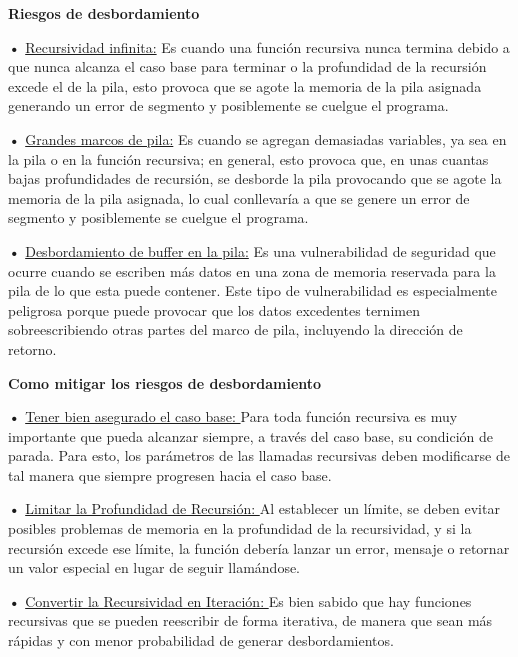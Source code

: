 \documentclass{article}
\begin{document}
\quad

\textbf{Riesgos de desbordamiento }

\quad

\textbf{•   } \underline{Recursividad infinita:} { Es cuando una función recursiva nunca termina debido a que nunca alcanza el caso base para terminar o la profundidad de la recursión excede el de la pila, esto provoca que se agote la memoria de la pila asignada generando un error de segmento y posiblemente se cuelgue el programa.}

\quad

\textbf{•   } \underline{Grandes marcos de pila:}{ Es cuando se agregan demasiadas variables, ya sea en la pila o en la función recursiva; en general, esto provoca que, en unas cuantas bajas profundidades de recursión, se desborde la pila provocando que se agote la memoria de la pila asignada, lo cual conllevaría a que se genere un error de segmento y posiblemente se cuelgue el programa.}

\quad

\textbf{•   } \underline{Desbordamiento de buffer en la pila:}{ Es una vulnerabilidad de seguridad que ocurre cuando se escriben más datos en una zona de memoria reservada para la pila de lo que esta puede contener. Este tipo de vulnerabilidad es especialmente peligrosa porque puede provocar que los datos excedentes ternimen sobreescribiendo otras partes del marco de pila, incluyendo la dirección de retorno.}

\quad

\textbf{Como mitigar los riesgos de desbordamiento }

\quad

\textbf{•   } \underline{Tener bien asegurado el caso base: }{Para toda función recursiva es muy importante que pueda alcanzar siempre, a través del caso base,  su condición de parada. Para esto, los parámetros de las llamadas recursivas deben modificarse de tal manera que siempre progresen hacia el caso base.}

\quad

\textbf{•   } \underline{Limitar la Profundidad de Recursión: }{ Al establecer un límite, se deben evitar posibles problemas de memoria en la profundidad de la recursividad, y si la recursión excede ese límite, la función debería lanzar un error, mensaje o retornar un valor especial en lugar de seguir llamándose.}

\quad

\textbf{•   } \underline{Convertir la Recursividad en Iteración: }{ Es bien sabido que hay funciones recursivas que se pueden reescribir de forma iterativa, de manera que sean más rápidas y con menor probabilidad de generar desbordamientos. }
\end{document}
